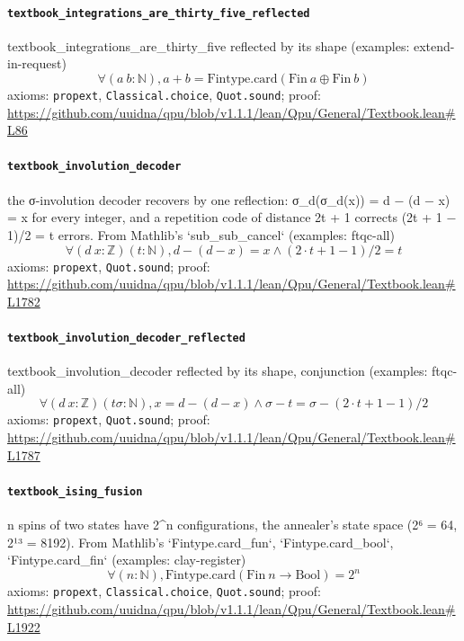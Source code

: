 \documentclass[11pt]{article}
\begin{document}
\paragraph{\texttt{textbook\_integrations\_are\_thirty\_five\_reflected}}
textbook\_integrations\_are\_thirty\_five reflected by its shape (examples: extend-in-request)
\[ \forall (a\ b : \mathbb{N}), a + b = \mathrm{Fintype.card} (\mathrm{Fin}\ a \oplus \mathrm{Fin}\ b) \]
\noindent axioms: \texttt{propext}, \texttt{Classical.choice}, \texttt{Quot.sound}; proof: \url{https://github.com/uuidna/qpu/blob/v1.1.1/lean/Qpu/General/Textbook.lean\#L86}

\paragraph{\texttt{textbook\_involution\_decoder}}
the σ-involution decoder recovers by one reflection: σ\_d(σ\_d(x)) = d − (d − x) = x for every integer, and a repetition code of distance 2t + 1 corrects (2t + 1 − 1)/2 = t errors. From Mathlib's `sub\_sub\_cancel` (examples: ftqc-all)
\[ \forall (d\ x : \mathbb{Z}) (t : \mathbb{N}), d - (d - x) = x \land (2 \cdot t + 1 - 1) / 2 = t \]
\noindent axioms: \texttt{propext}, \texttt{Quot.sound}; proof: \url{https://github.com/uuidna/qpu/blob/v1.1.1/lean/Qpu/General/Textbook.lean\#L1782}

\paragraph{\texttt{textbook\_involution\_decoder\_reflected}}
textbook\_involution\_decoder reflected by its shape, conjunction (examples: ftqc-all)
\[ \forall (d\ x : \mathbb{Z}) (t \sigma : \mathbb{N}), x = d - (d - x) \land \sigma - t = \sigma - (2 \cdot t + 1 - 1) / 2 \]
\noindent axioms: \texttt{propext}, \texttt{Quot.sound}; proof: \url{https://github.com/uuidna/qpu/blob/v1.1.1/lean/Qpu/General/Textbook.lean\#L1787}

\paragraph{\texttt{textbook\_ising\_fusion}}
n spins of two states have 2\^{}n configurations, the annealer's state space (2⁶ = 64, 2¹³ = 8192). From Mathlib's `Fintype.card\_fun`, `Fintype.card\_bool`, `Fintype.card\_fin` (examples: clay-register)
\[ \forall (n : \mathbb{N}), \mathrm{Fintype.card} (\mathrm{Fin}\ n \to \mathrm{Bool}) = 2 ^{n} \]
\noindent axioms: \texttt{propext}, \texttt{Classical.choice}, \texttt{Quot.sound}; proof: \url{https://github.com/uuidna/qpu/blob/v1.1.1/lean/Qpu/General/Textbook.lean\#L1922}
\end{document}
